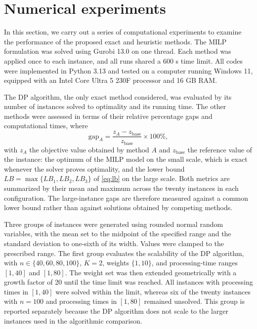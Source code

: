 \documentclass[12pt]{article}
\let\origsection\section
\renewcommand{\section}{\FloatBarrier\origsection}
\begin{document}
\begin{sloppypar}
        
     
        \section{Numerical experiments} \label{sec-test}
        
        In this section, we carry out a series of computational experiments to examine the performance of the proposed exact and heuristic methods. The MILP formulation was solved using Gurobi 13.0 on one thread. Each method was applied once to each instance, and all runs shared a 600 s time limit. All codes were implemented in Python 3.13 and tested on a computer
        running Windows 11, equipped with an Intel Core Ultra 5 230F processor and 16 GB RAM. 
        
        The DP algorithm, the only exact method considered, was evaluated by its
        number of instances solved to optimality and its running time. The other
        methods were assessed in terms of their relative percentage gaps and
        computational times, where
        \begin{equation}\label{eq:gap}
            \text{gap}_A =
            \frac{z_A-z_{\text{base}}}{z_{\text{base}}}\times 100\%,
        \end{equation}
        with \(z_A\) the objective value obtained by method \(A\) and
        \(z_{\text{base}}\) the reference value of the instance: the optimum of the MILP
        model on the small scale, which is exact whenever the solver proves optimality,
        and the lower bound \(LB=\max\{LB_1,LB_2,LB_3\}\) of \cref{eq:lb} on the large
        scale. Both metrics are summarized by their mean and maximum across the twenty
        instances in each configuration. The large-instance gaps are therefore measured
        against a common lower bound rather than against solutions obtained by competing
        methods.
        
        Three groups of instances were generated using rounded normal random
        variables, with the mean set to the midpoint of the specified range and
        the standard deviation to one-sixth of its width. Values were clamped
        to the prescribed range. The first group evaluates the scalability of
        the DP algorithm, with \(n\in\{40,60,80,100\}\), \(K=2\), weights
        \(\{1,10\}\), and processing-time ranges \([1,40]\) and \([1,80]\).
        The weight set was then extended geometrically with a growth factor of
        20 until the time limit was reached. All instances with processing times
        in \([1,40]\) were solved within the limit, whereas six of the twenty
        instances with \(n=100\) and processing times in \([1,80]\) remained
        unsolved. This group is reported separately because the DP algorithm
        does not scale to the larger instances used in the algorithmic comparison.
        

\end{sloppypar}
\end{document}

